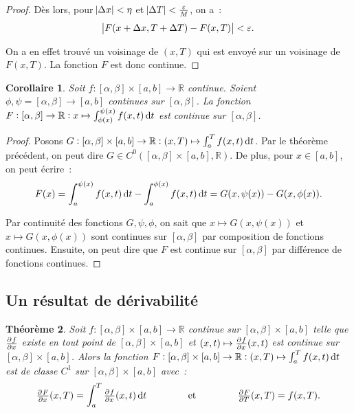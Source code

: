 \documentclass{report}
\newtheorem{thm}{Théorème}[chapter]
\newtheorem{cor}[thm]{Corollaire}
\theoremstyle{definition}
\theoremstyle{remark}
\numberwithin{equation}{section}
\newcommand{\R}{\mathbb R}
\begin{document}
\begin{proof}
			Dès lors, pour $\abs {\Delta x} < \eta$ et $\abs {\Delta T} < \frac \varepsilon M$, on a~:
			\begin{equation}
				\abs {F(x+\Delta x, T + \Delta T) - F(x, T)} < \varepsilon.
			\end{equation}

			On a en effet trouvé un voisinage de $(x, T)$ qui est envoyé sur un voisinage de $F(x, T)$. La fonction $F$ est donc continue.
			\end{proof}

			\begin{cor} Soit $f : [\alpha, \beta] \times [a, b] \to \R$ continue. Soient $\phi, \psi = [\alpha, \beta] \to [a, b]$ continues sur $[\alpha, \beta]$.
			La fonction $F : [\alpha, \beta] \to \R : x \mapsto \int_{\phi(x)}^{\psi(x)}f(x, t)\dif t$ est continue sur $[\alpha, \beta]$.
			\end{cor}

			\begin{proof} Posons $G : [\alpha, \beta] \times [a, b] \to \R : (x, T) \mapsto \int_a^T f(x, t)\dif t$. Par le théorème précédent, on peut dire
			$G \in C^0([\alpha, \beta] \times [a, b], \R)$. De plus, pour $x \in [a, b]$, on peut écrire~:
			\begin{equation}
				F(x) = \int_a^{\psi(x)}f(x, t)\dif t - \int_a^{\phi(x)}f(x, t)\dif t = G(x, \psi(x)) - G(x, \phi(x)).
			\end{equation}

			Par continuité des fonctions $G, \psi, \phi$, on sait que $x \mapsto G(x, \psi(x))$ et $x \mapsto G(x, \phi(x))$ sont continues sur $[\alpha, \beta]$
			par composition de fonctions continues. Ensuite, on peut dire que $F$ est continue sur $[\alpha, \beta]$ par différence de fonctions continues.
			\end{proof}

		\subsection{Un résultat de dérivabilité}
			\begin{thm}\label{thm:dérivabilitésegmentvariable} Soit $f : [\alpha, \beta] \times [a, b] \to \R$ continue sur $[\alpha, \beta] \times [a, b]$
			telle que $\pd fx$ existe en tout point de $[\alpha, \beta] \times [a, b]$ et $(x, t) \mapsto \pd fx(x, t)$ est continue sur
			$[\alpha, \beta] \times [a, b]$. Alors la fonction $F : [\alpha, \beta] \times [a, b] \to \R : (x, T) \mapsto \int_a^Tf(x, t)\dif t$ est de classe
			$C^1$ sur $[\alpha, \beta] \times [a, b]$ avec~:
			\begin{equation}
				\pd Fx(x, T) = \int_a^T\pd fx(x, t)\dif t \qquad\qquad\text{ et }\qquad\qquad \pd FT(x, T) = f(x, T).
			\end{equation}
			\end{thm}
\end{document}
